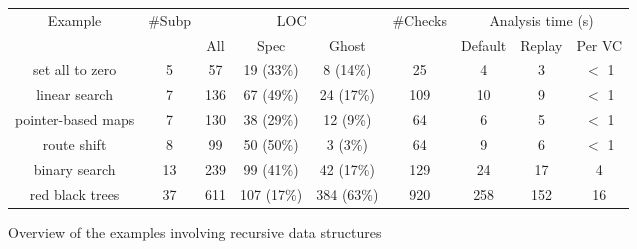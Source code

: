 \documentclass[runningheads]{llncs}
\begin{document}
\begin{figure}
\vspace{-5mm}
\setlength{\tabcolsep}{3pt}
\renewcommand{\arraystretch}{1.5}
\begin{center}
\scriptsize
\begin{tabular}{ c c ccc c ccc }
 \hline
\multirow{2}{*}{Example} &
\multirow{2}{*}{\#Subp} &
\multicolumn{3}{c}{LOC}&
\multirow{2}{*}{\#Checks} &
\multicolumn{3}{c}{Analysis time (s)}\\
& & All & Spec & Ghost & &
Default & Replay & Per VC\\
\hline
set all to zero
& 5
& 57
& 19 (33\%)
& 8 (14\%)
& 25
& 4
& 3
& $<$ 1\\
linear search
& 7
& 136
& 67 (49\%)
& 24 (17\%)
& 109
& 10
& 9
& $<$ 1\\
pointer-based maps
& 7
& 130
& 38 (29\%)
& 12 (9\%)
& 64
& 6
& 5
& $<$ 1\\
route shift
& 8
& 99
& 50 (50\%)
& 3 (3\%)
& 64
& 9
& 6
& $<$ 1\\
binary search
& 13
& 239
& 99 (41\%)
& 42 (17\%)
& 129
& 24
& 17
& 4\\
red black trees
& 37
& 611
& 107 (17\%)
& 384 (63\%)
& 920
& 258
& 152
& 16\\
\hline
\end{tabular}
\end{center}
\caption {\label{table-examples}Overview of the examples involving recursive data structures}
\vspace{-5mm}
\end{figure}
\end{document}
